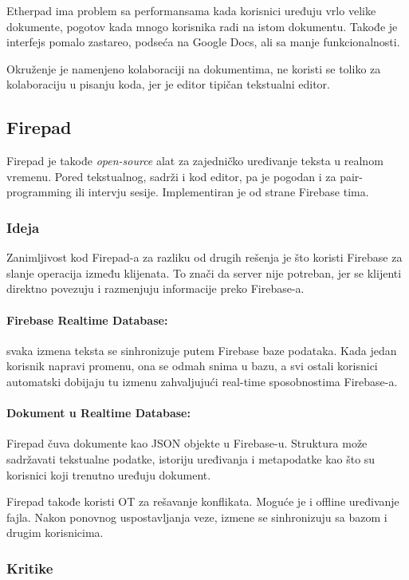 \documentclass[12pt]{article}
\begin{document}
Etherpad ima problem sa performansama kada korisnici uređuju vrlo velike dokumente, pogotov kada mnogo korisnika radi na istom dokumentu. Takođe je interfejs pomalo zastareo, podseća na Google Docs, ali sa manje funkcionalnosti. 

Okruženje je namenjeno kolaboraciji na dokumentima, ne koristi se toliko za kolaboraciju u pisanju koda, jer je editor tipičan tekstualni editor.

\subsection{Firepad}

Firepad je takođe \textit{open-source} alat za zajedničko uređivanje teksta u realnom vremenu. Pored tekstualnog, sadrži i kod editor, pa je pogodan i za pair-programming ili intervju sesije. Implementiran je od strane Firebase tima.

\subsubsection{Ideja}

Zanimljivost kod Firepad-a za razliku od drugih rešenja je što koristi Firebase za slanje operacija između klijenata. To znači da server nije potreban, jer se klijenti direktno povezuju i razmenjuju informacije preko Firebase-a. 

\paragraph{Firebase Realtime Database: } svaka izmena teksta se sinhronizuje putem Firebase baze podataka. Kada jedan korisnik napravi promenu, ona se odmah snima u bazu, a svi ostali korisnici automatski dobijaju tu izmenu zahvaljujući real-time sposobnostima Firebase-a.

\paragraph{Dokument u Realtime Database: } Firepad čuva dokumente kao JSON objekte u Firebase-u. Struktura može sadržavati tekstualne podatke, istoriju uređivanja i metapodatke kao što su korisnici koji trenutno uređuju dokument.

Firepad takođe koristi OT za rešavanje konflikata. Moguće je i offline uređivanje fajla. Nakon ponovnog uspostavljanja veze, izmene se sinhronizuju sa bazom i drugim korisnicima.

\subsubsection{Kritike}
\end{document}
